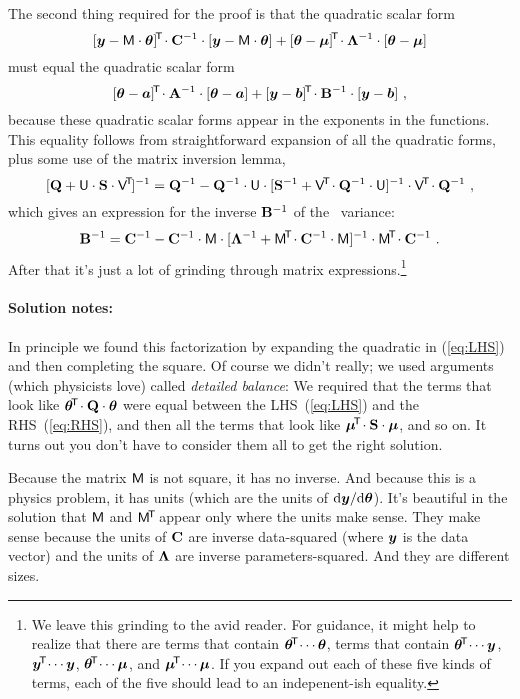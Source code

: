 The second thing required for the proof is that the quadratic scalar form
\begin{equation}\label{eq:LHS}
[\boldsymbol{y}-\mathsf{M}\cdot\boldsymbol{\theta}]^{\!\mathsf{T}\!}\cdot\mathbf{C}^{-1}\cdot[\boldsymbol{y}-\mathsf{M}\cdot\boldsymbol{\theta}]
+ [\boldsymbol{\theta}-\boldsymbol{\mu}]^{\!\mathsf{T}\!}\cdot\mathbf{\Lambda}^{-1}\cdot[\boldsymbol{\theta}-\boldsymbol{\mu}]
\end{equation}
must equal the quadratic scalar form
\begin{equation}\label{eq:RHS}
[\boldsymbol{\theta}-\boldsymbol{a}]^{\!\mathsf{T}\!}\cdot\mathbf{A}^{-1}\cdot[\boldsymbol{\theta}-\boldsymbol{a}]
+ [\boldsymbol{y}-\boldsymbol{b}]^{\!\mathsf{T}\!}\cdot\mathbf{B}^{-1}\cdot[\boldsymbol{y}-\boldsymbol{b}]
~,
\end{equation}
because these quadratic scalar forms appear in the exponents in the functions.
This equality follows from straightforward expansion of
all the quadratic forms, plus some use of the matrix inversion lemma,
\begin{equation}\label{eq:invlemma}
[\mathbf{Q} + \mathsf{U}\cdot\mathbf{S}\cdot\mathsf{V}^{\!\mathsf{T}\!}]^{-1} = \mathbf{Q}^{-1} - \mathbf{Q}^{-1}\cdot\mathsf{U}\cdot[\mathbf{S}^{-1} + \mathsf{V}^{\!\mathsf{T}\!}\cdot\mathbf{Q}^{-1}\cdot\mathsf{U}]^{-1}\cdot\mathsf{V}^{\!\mathsf{T}\!}\cdot\mathbf{Q}^{-1}
~ ,
\end{equation}
which gives an expression for the inverse $\mathbf{B}^{-1}$ of the \FML\ variance:
\begin{equation}
\mathbf{B}^{-1} = \mathbf{C}^{-1} - \mathbf{C}^{-1}\cdot\mathsf{M}\cdot[\mathbf{\Lambda}^{-1} + \mathsf{M}^{\!\mathsf{T}\!}\cdot\mathbf{C}^{-1}\cdot\mathsf{M}]^{-1}\cdot\mathsf{M}^{\!\mathsf{T}\!}\cdot\mathbf{C}^{-1}
~ .
\end{equation}
After that it's just a lot of grinding through matrix expressions.\footnote{%
We leave this grinding to the avid reader.
For guidance, it might help to realize that there are terms that
contain $\boldsymbol{\theta}^{\!\mathsf{T}\!}\cdots\boldsymbol{\theta}$, terms that contain
$\boldsymbol{\theta}^{\!\mathsf{T}\!}\cdots\boldsymbol{y}$, $\boldsymbol{y}^{\!\mathsf{T}\!}\cdots\boldsymbol{y}$, $\boldsymbol{\theta}^{\!\mathsf{T}\!}\cdots\boldsymbol{\mu}$, and
$\boldsymbol{\mu}^{\!\mathsf{T}\!}\cdots\boldsymbol{\mu}$.
If you expand out each of these five kinds of terms, each of the five
should lead to an indepenent-ish equality.}

\paragraph{Solution notes:}
In principle we found this factorization by expanding the quadratic in
(\ref{eq:LHS}) and then completing the square.
Of course we didn't really; we used arguments (which physicists love)
called \emph{detailed balance}:
We required that the terms that look like
$\boldsymbol{\theta}^{\!\mathsf{T}\!}\cdot\mathbf{Q}\cdot\boldsymbol{\theta}$ were equal between the LHS~(\ref{eq:LHS})
and the RHS~(\ref{eq:RHS}), and then all the terms that look like
$\boldsymbol{\mu}^{\!\mathsf{T}\!}\cdot\mathbf{S}\cdot\boldsymbol{\mu}$, and so on.
It turns out you don't have to consider them all to get the right solution.

Because the matrix $\mathsf{M}$ is not square, it has no inverse. And because this
is a physics problem, it has units (which are the units of $\mathrm{d}\boldsymbol{y}/\mathrm{d}\boldsymbol{\theta}$).
It's beautiful in the solution that $\mathsf{M}$ and $\mathsf{M}^{\!\mathsf{T}\!}$ appear only where the
units make sense.
They make sense because the units of $\mathbf{C}$ are inverse data-squared (where $\boldsymbol{y}$
is the data vector) and the units of $\mathbf{\Lambda}$ are inverse parameters-squared.
And they are different sizes.

